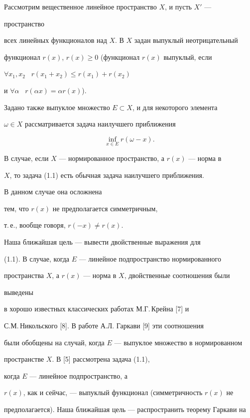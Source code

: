  


Рассмотрим вещественное линейное пространство $X$, и пусть $X'$ --- 


пространство 


всех линейных функционалов над $X$. В $X$ задан выпуклый неотрицательный 


функционал $r(x)$, $r(x)\ge0$ (функционал $r(x)$ выпуклый, если 


$\forall x_1,x_2$ \ $r(x_1+x_2)\le r(x_1)+r(x_2)$ 


и $\forall\alpha$ \ $r(\alpha x)=\alpha r(x)$). 


Задано также выпуклое множество $E\subset X$, и для некоторого элемента 


$\omega\in X$ рассматривается задача наилучшего приближения 


\begin{equation} 


\inf_{x\in E}r(\omega-x). 


\end{equation} 


В случае, если $X$ --- нормированное пространство, а $r(x)$ --- норма в 


$X$, то задача (1.1) есть обычная задача наилучшего приближения. 


В данном случае она осложнена 


тем, что $r(x)$ не предполагается симметричным,


т.\,е., вообще говоря, $r(-x)\ne r(x)$.


Наша ближайшая цель --- вывести двойственные выражения для 


(1.1). В случае, когда $E$ --- линейное подпространство нормированного 


пространства $X$, а $r(x)$ --- норма в $X$, двойственные соотношения были 


выведены 


в хорошо известных классических работах М.Г.\,Крейна [7] и 


С.М.\,Никольского [8]. В работе А.Л. Гаркави [9] эти соотношения 


были обобщены на случай, когда $E$ --- выпуклое множество в нормированном 


пространстве $X$. В [5] рассмотрена задача (1.1), 


когда $E$ --- линейное подпространство, а 


$r(x)$, как и сейчас, --- выпуклый функционал (симметричность $r(x)$ не 


предполагается). Наша ближайшая цель --- распространить теорему Гаркави на 


